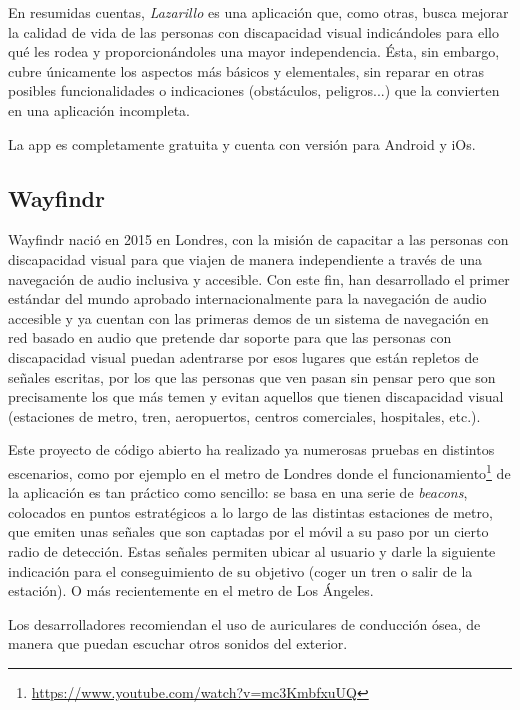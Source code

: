 En resumidas cuentas, \textit{Lazarillo} es una aplicación que, como otras, busca mejorar la calidad de vida de las personas con discapacidad visual indicándoles para ello qué les rodea y proporcionándoles una mayor independencia. Ésta, sin embargo, cubre únicamente los aspectos más básicos y elementales, sin reparar en otras posibles funcionalidades o indicaciones (obstáculos, peligros...) que la convierten en una aplicación incompleta.

La app es completamente gratuita y cuenta con versión para Android y iOs.
\subsection{Wayfindr} 
Wayfindr \citep{wayfindrOnline} nació en 2015 en Londres, con la misión de capacitar a las personas con discapacidad visual para que viajen de manera independiente a través de una navegación de audio inclusiva y accesible. Con este fin, han desarrollado el primer estándar del mundo aprobado internacionalmente para la navegación de audio accesible y ya cuentan con las primeras demos de un sistema de navegación en red basado en audio que pretende dar soporte para que las personas con discapacidad visual puedan adentrarse por esos lugares que están repletos de señales escritas, por los que las personas que ven pasan sin pensar pero que son precisamente los que más temen y evitan aquellos que tienen discapacidad visual (estaciones de metro, tren, aeropuertos, centros comerciales, hospitales, etc.). 

Este proyecto de código abierto ha realizado ya numerosas pruebas en distintos escenarios, como por ejemplo en el metro de Londres donde el funcionamiento\footnote{\url{https://www.youtube.com/watch?v=mc3KmbfxuUQ}} de la aplicación es tan práctico como sencillo: se basa en una serie de \textit{beacons}, colocados en puntos estratégicos a lo largo de las distintas estaciones de metro, que emiten unas señales que son captadas por el móvil a su paso por un cierto radio de detección. Estas señales permiten ubicar al usuario y darle la siguiente indicación para el conseguimiento de su objetivo (coger un tren o salir de la estación). O más recientemente en el metro de Los Ángeles.

Los desarrolladores recomiendan el uso de auriculares de conducción ósea, de manera que puedan escuchar otros sonidos del exterior.


